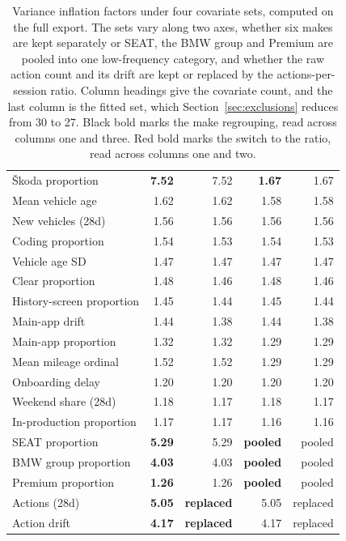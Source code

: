\begin{table}[htbp]
\begin{tabular}{@{}lrrrr@{}}
Škoda proportion            & \textbf{7.52} & 7.52 & \textbf{1.67} & 1.67 \\
Mean vehicle age            & 1.62 & 1.62 & 1.58 & 1.58 \\
New vehicles (28d)          & 1.56 & 1.56 & 1.56 & 1.56 \\
Coding proportion           & 1.54 & 1.53 & 1.54 & 1.53 \\
Vehicle age SD              & 1.47 & 1.47 & 1.47 & 1.47 \\
Clear proportion            & 1.48 & 1.46 & 1.48 & 1.46 \\
History-screen proportion   & 1.45 & 1.44 & 1.45 & 1.44 \\
Main-app drift              & 1.44 & 1.38 & 1.44 & 1.38 \\
Main-app proportion         & 1.32 & 1.32 & 1.29 & 1.29 \\
Mean mileage ordinal        & 1.52 & 1.52 & 1.29 & 1.29 \\
Onboarding delay            & 1.20 & 1.20 & 1.20 & 1.20 \\
Weekend share (28d)         & 1.18 & 1.17 & 1.18 & 1.17 \\
In-production proportion    & 1.17 & 1.17 & 1.16 & 1.16 \\
\addlinespace
SEAT proportion             & \textbf{5.29} & 5.29 & \textbf{pooled} & pooled \\
BMW group proportion        & \textbf{4.03} & 4.03 & \textbf{pooled} & pooled \\
Premium proportion          & \textbf{1.26} & 1.26 & \textbf{pooled} & pooled \\
Actions (28d)               & \textbf{\textcolor{volhl}{5.05}} & \textbf{\textcolor{volhl}{replaced}} & 5.05 & replaced \\
Action drift                & \textbf{\textcolor{volhl}{4.17}} & \textbf{\textcolor{volhl}{replaced}} & 4.17 & replaced \\
\bottomrule
\end{tabular}
\caption{Variance inflation factors under four covariate sets, computed on the full export. The sets vary along two axes, whether six makes are kept separately or SEAT, the BMW group and Premium are pooled into one low-frequency category, and whether the raw action count and its drift are kept or replaced by the actions-per-session ratio. Column headings give the covariate count, and the last column is the fitted set, which Section~\ref{sec:exclusions} reduces from 30 to 27. Black bold marks the make regrouping, read across columns one and three. Red bold marks the switch to the ratio, read across columns one and two.}
\label{tab:vif}
\end{table}

